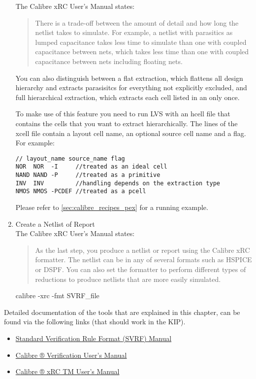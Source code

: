 \begin{enumerate}
		The Calibre xRC User's Manual \citep{calibre2014xrc} states:
		\begin{quote}
		 There is a trade-off between the amount of detail and how long the
		 netlist takes to simulate. For example, a netlist with parasitics as
		 lumped capacitance takes less time to simulate than one with coupled
		 capacitance between nets, which takes less time than one
		 with coupled capacitance between nets including floating nets.
		\end{quote}

		You can also distinguish between a flat extraction, which flattens all
		design hierarchy and extracts parasisitcs for everything not
		explicitly excluded, and full hierarchical extraction, which extracts
		each cell listed in an  only once.

		To make use of this feature you need to run \gls{LVS} with an hcell
		file that contains the cells that you want to extract hierarchically.
		The lines of the xcell file contain a layout cell name, an optional
		source cell name and a flag.
		For example:
		\begin{verbatim}
// layout_name source_name flag
NOR  NOR  -I     //treated as an ideal cell
NAND NAND -P     //treated as a primitive
INV  INV         //handling depends on the extraction type
NMOS NMOS -PCDEF //treated as a pcell
		\end{verbatim}

	Please refer to \cref{sec:calibre_recipes_pex} for a running example.

	\item Create a Netlist of Report\\
		The Calibre xRC User's Manual \citep{calibre2014xrc} states:
		\begin{quote}
As the last step, you produce a netlist or report using the Calibre xRC formatter. The netlist can
be in any of several formats such as HSPICE or DSPF. You can also set the formatter to
perform different types of reductions to produce netlists that are more easily simulated.
		\end{quote}
	\begin{lstbashplain}
calibre -xrc -fmt SVRF_file
	\end{lstbashplain}
\end{enumerate}

Detailed documentation of the tools that are explained in this chapter, can be
found via the following links (that should work in the KIP).
\begin{itemize}
	\item
		\href{file:///cad/products/mentor/calibre_2014.2_33.25/docs_cal_2014.2_14.13/docs/pdfdocs/svrf_ur.pdf}{Standard
		Verification Rule Format (SVRF) Manual}
	\item
		\href{file:///cad/products/mentor/calibre_2014.2_33.25/docs_cal_2014.2_14.13/docs/pdfdocs/calbr_ver_user.pdf}{
		Calibre ® Verification User’s Manual}
	\item \href{file:///cad/products/mentor/calibre_2014.2_33.25/docs_cal_2014.2_14.13/docs/pdfdocs/xrc_user.pdf}
		{Calibre ® xRC TM User’s Manual}
\end{itemize}

